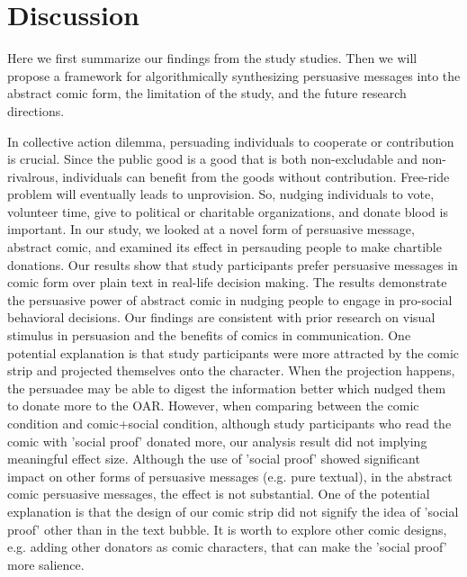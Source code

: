 \section{Discussion}
\label{sec:Discussion}
Here we first summarize our findings from the study studies. Then we will propose a framework for algorithmically synthesizing persuasive messages into the abstract comic form, the limitation of the study, and the future research directions. 


In collective action dilemma, persuading individuals to cooperate or contribution is crucial. Since the public good is a good that is both non-excludable and non-rivalrous, individuals can benefit from the goods without contribution. Free-ride problem will eventually leads to unprovision. So, nudging individuals to vote, volunteer time, give to political or charitable organizations, and donate blood is important. In our study, we looked at a novel form of persuasive message, abstract comic, and examined its effect in persauding people to make chartible donations. Our results show that study participants prefer persuasive messages in comic form over plain text in real-life decision making. The results demonstrate the persuasive power of abstract comic in nudging people to engage in pro-social behavioral decisions. Our findings are consistent with prior research on visual stimulus in persuasion and the benefits of comics in communication. One potential explanation is that study participants were more attracted by the comic strip and projected themselves onto the character. When the projection happens, the persuadee may be able to digest the information better which nudged them to donate more to the OAR. However, when comparing between the comic condition and comic+social condition, although study participants who read the comic with 'social proof' donated more, our analysis result did not implying meaningful effect size. Although the use of 'social proof' showed significant impact on other forms of persuasive messages (e.g. pure textual), in the abstract comic persuasive messages, the effect is not substantial. One of the potential explanation is that the design of our comic strip did not signify the idea of 'social proof' other than in the text bubble. It is worth to explore other comic designs, e.g. adding other donators as comic characters, that can make the 'social proof' more salience. 

